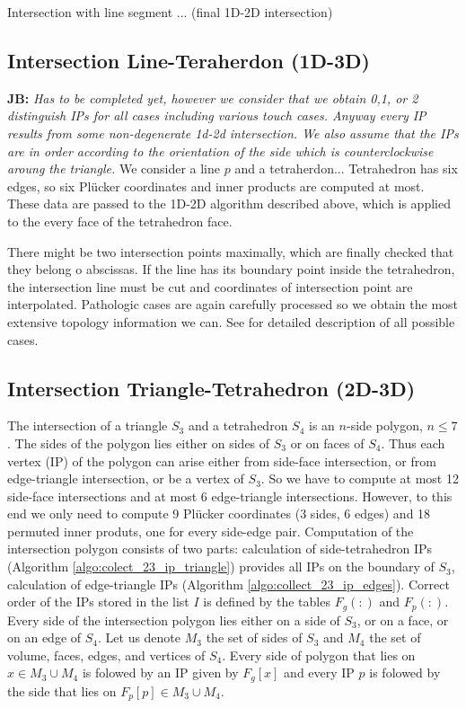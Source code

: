 \documentclass{elsarticle}
\newcommand{\noteJB}[1]{{\color{Blue} \textbf{JB: } \textit{#1}}}
\newcommand{\plucker}{Pl\"{u}cker }
\begin{document}
Intersection with line segment ... (final 1D-2D intersection)

\subsection{Intersection Line-Teraherdon (1D-3D)}
\noteJB{Has to be completed yet, however we consider that we obtain 0,1, or 2 distinguish IPs for all cases including various touch cases. Anyway every IP results from 
some non-degenerate 1d-2d intersection. We also assume that the IPs are in order according to the orientation of the side which is
counterclockwise aroung the triangle.}
We consider a line $p$ and a tetraherdon...
Tetrahedron has six edges, so six \plucker coordinates and inner products are computed at most. These data are
passed to the 1D-2D algorithm described above, which is applied to the every face of the tetrahedron face. 

There might be two intersection points maximally, which are finally checked that they belong o abscissas.
If the line has its boundary point inside the tetrahedron, the intersection line must be cut
and coordinates of intersection point are interpolated.
Pathologic cases are again carefully processed so we obtain the most extensive topology information we can.
See \cite{fris_dp_2015} for detailed description of all possible cases.

\subsection{Intersection Triangle-Tetrahedron (2D-3D)}
The intersection of a triangle $S_3$ and a tetrahedron $S_4$ is an $n$-side polygon, $n\le 7$. The sides of the polygon
lies either on sides of $S_3$ or on faces of $S_4$. Thus each vertex (IP) of the polygon
can arise either from side-face intersection, or from edge-triangle intersection, or be a vertex of $S_3$.
So we have to compute at most 12 side-face intersections and at most 6 edge-triangle intersections. However,
to this end we only need to compute 9 \plucker coordinates (3 sides, 6 edges) and 18 permuted inner produts, one for every side-edge pair.
Computation of the intersection polygon consists of two parts: calculation of side-tetrahedron IPs (Algorithm \ref{algo:colect_23_ip_triangle})
provides all IPs on the boundary of $S_3$,
calculation of edge-triangle IPs (Algorithm \ref{algo:collect_23_ip_edges}).
Correct order of the IPs stored in the list $I$ is defined by the tables $F_g(:)$ and $F_p(:)$. Every side of the intersection polygon 
lies either on a side of $S_3$, or on a face, or on an edge of $S_4$. Let us denote $M_3$ the set of sides of $S_3$ and $M_4$ the set of volume,
faces, edges, and vertices of $S_4$. Every side of polygon that lies on $x\in M_3\cup M_4$ is folowed by an IP given by $F_g[x]$ 
and every IP $p$ is folowed by the side that lies on $F_p[p]\in M_3\cup M_4$. 
\end{document}
